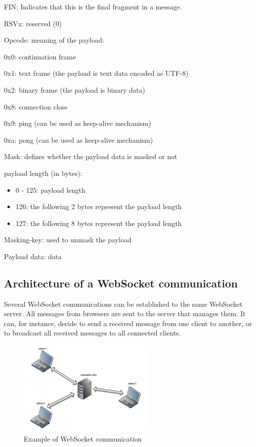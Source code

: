 \documentclass[pdftex,10pt,a4paper]{report}
\newenvironment{packed_item}{
\begin{itemize}
  \setlength{\itemsep}{1pt}
  \setlength{\parskip}{0pt}
  \setlength{\parsep}{0pt}
}{\end{itemize}}
\begin{document}
\begin{packed_item}
	\item FIN: Indicates that this is the final fragment in a message.
	\item RSVx: reserved (0)
	\item Opcode: meaning of the payload:
		\begin{packed_item}
			\item 0x0: continuation frame
			\item 0x1: text frame (the payload is text data encoded as UTF-8)
			\item 0x2: binary frame (the payload is binary data)
			\item 0x8: connection close
			\item 0x9: ping (can be used as keep-alive mechanism)
			\item 0xa: pong (can be used as keep-alive mechanism)
		\end{packed_item}
	\item Mask: defines whether the payload data is masked or not
	\item payload length (in bytes):
		\begin{itemize}
			\item 0 - 125: payload length
			\item 126: the following 2 bytes represent the payload length
			\item 127: the following 8 bytes represent the payload length
		\end{itemize}
	\item Masking-key: used to unmask the payload
	\item Payload data: data
\end{packed_item}


\subsection{Architecture of a WebSocket communication}
Several WebSocket communications can be established to the same WebSocket server. All messages from browsers are sent to the server that manages them. It can, for instance, decide to send a received message from one client to another, or to broadcast all received messages to all connected clients.


\begin{figure}[h!]
		\centering
		\includegraphics[width=0.6\textwidth]{./ws.jpg}
		\caption{Example of WebSocket communication}
		\label{Example of WebSocket communication}
\end{figure}
\end{document}
